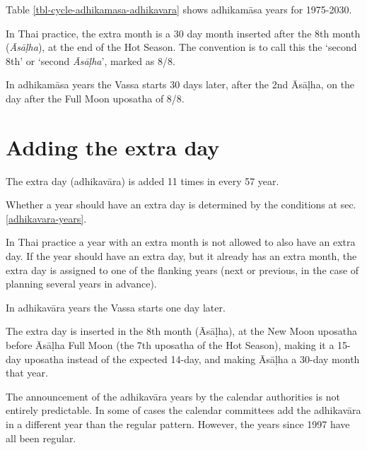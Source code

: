 \documentclass[11pt,oneside]{memoir-article}
\begin{document}
Table \ref{tbl-cycle-adhikamasa-adhikavara} shows adhikamāsa years for 1975-2030.

In Thai practice, the extra month is a 30 day month inserted after the
8th month (\emph{Āsāḷha}), at the end of the Hot Season. The convention is
to call this the `second 8th' or `second \emph{Āsāḷha}', marked as 8/8.


In adhikamāsa years the Vassa starts 30 days later, after the 2nd
Āsāḷha, on the day after the Full Moon uposatha of 8/8.

\section{Adding the extra day}
\label{sec-2-2}
\label{adding-extra-day}

The extra day (adhikavāra) is added 11 times in every 57 year.

Whether a year should have an extra day is determined by the conditions at
sec. \ref{adhikavara-years}.

In Thai practice a year with an extra month is not allowed to also
have an extra day. If the year should have an extra day, but it
already has an extra month, the extra day is assigned to one of the
flanking years (next or previous, in the case of planning several
years in advance).

In adhikavāra years the Vassa starts one day later.

The extra day is inserted in the 8th month (Āsāḷha), at the New Moon uposatha
before Āsāḷha Full Moon (the 7th uposatha of the Hot Season), making it a 15-day
uposatha instead of the expected 14-day, and making Āsāḷha a 30-day month that
year.\autocite{hasapannyo-zodiac}

The announcement of the adhikavāra years by the calendar authorities is not
entirely predictable. In some of cases the calendar committees add the
adhikavāra in a different year than the regular pattern. However, the years
since 1997 have all been regular.
\end{document}
